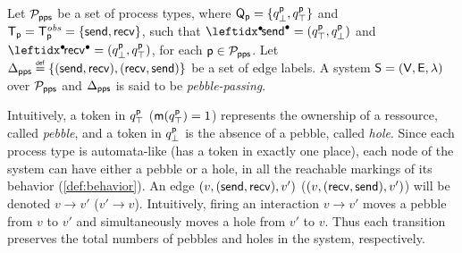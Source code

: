 \begin{definition}\label{def:pebble-passing-systems}
  Let $\mathcal{P}_{\mathsf{pps}}$ be a set of process types, where
  $\mathsf{Q}_{\mathsf{p}} = {\{ {q^{\mathsf{p}}_\bot, q^{\mathsf{p}}_\top} \}}$ and
  $\mathsf{T}_{\mathsf{p}} = \mathsf{T}^\mathit{obs}_{\mathsf{p}} = {\{ {\mathsf{send}, \mathsf{recv}} \}}$, such
  that $\prepost{\send} = (q^\ptype_\top, q^\ptype_\bot)$ and
  $\prepost{\recv} = (q^\ptype_\bot, q^\ptype_\top)$, for each $\mathsf{p}
  \in \mathcal{P}_{\mathsf{pps}}$. Let
  $\Delta_{\mathsf{pps}}\stackrel{\scriptscriptstyle{\mathsf{def}}}{=}{\{ {(\mathsf{send},\mathsf{recv}),(\mathsf{recv},\mathsf{send})} \}}$ be a set of
  edge labels. A system $\mathsf{S}=(\mathsf{V},\mathsf{E},\lambda)$ over
  $\mathcal{P}_{\mathsf{pps}}$ and $\Delta_{\mathsf{pps}}$ is said to be
  \emph{pebble-passing}.
\end{definition}
Intuitively, a token in $q^{\mathsf{p}}_\top$ (\ie $\mathsf{m}(q^{\mathsf{p}}_\top) =
1$) represents the ownership of a ressource, called \emph{pebble}, and
a token in $q^{\mathsf{p}}_\bot$ is the absence of a pebble, called
\emph{hole}. Since each process type is automata-like (\ie has a token
in exactly one place), each node of the system can have either a
pebble or a hole, in all the reachable markings of its behavior
(\autoref{def:behavior}). An edge $(v, (\mathsf{send}, \mathsf{recv}), v')$
(\resp $(v, (\mathsf{recv}, \mathsf{send}), v')$) will be denoted $v \to v'$
(\resp $v' \to v$). Intuitively, firing an interaction $v \to v'$
moves a pebble from $v$ to $v'$ and simultaneously moves a hole from
$v'$ to $v$. Thus each transition preserves the total numbers of
pebbles and holes in the system, respectively. 





